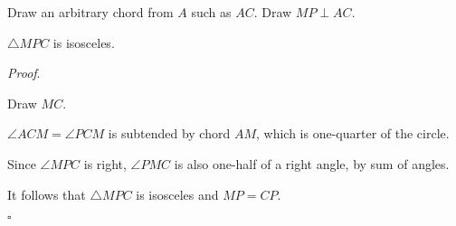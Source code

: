 \documentclass[11pt, oneside]{article}
\begin{document}
Draw an arbitrary chord from $A$ such as $AC$.  Draw $MP \perp AC$.

$\triangle MPC$ is isosceles.

\emph{Proof}.

Draw $MC$.

$\angle ACM = \angle PCM$ is subtended by chord $AM$, which is one-quarter of the circle.

Since $\angle MPC$ is right, $\angle PMC$ is also one-half of a right angle, by sum of angles.

It follows that $\triangle MPC$ is isosceles and $MP = CP$.

$\square$
\end{document}
